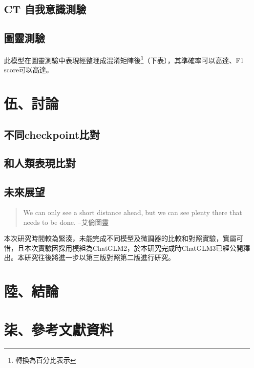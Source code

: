 \documentclass[8pt,a4paper,新細明體,UTF8,natbib]{article}
\begin{document}
\begin{CJK*}{UTF8}{bsmi}
	\subsection{CT 自我意識測驗}
	\subsection{圖靈測驗}
	此模型在圖靈測驗中表現經整理成混淆矩陣後\footnote{轉換為百分比表示}（下表），其準確率可以高達、F1 score可以高達。
	
	\section{伍、討論}
	\subsection{不同checkpoint比對}
	\subsection{和人類表現比對}
	\subsection{未來展望}
	\begin{quote}
		We can only see a short distance ahead, but we can see plenty there that needs to be done.	--艾倫圖靈
	\end{quote}
	本次研究時間較為緊湊，未能完成不同模型及微調器的比較和對照實驗，實屬可惜，且本次實驗因採用模組為ChatGLM2，於本研究完成時ChatGLM3已經公開釋出。本研究往後將進一步以第三版對照第二版進行研究。
	\section{陸、結論}

	\section{柒、參考文獻資料}

\renewcommand{\refname}{}

\end{CJK*}
\end{document}
